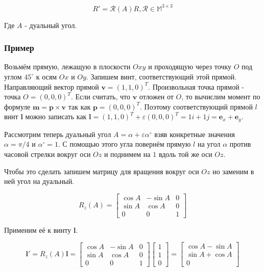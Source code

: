   \begin{equation*}
    R' = \mathcal{R}(A) R, \mathcal{R} \in \mathbb{M}^{3 \times 3}
  \end{equation*}

  Где $A$ - дуальный угол. 

  \subsubsection{Пример}
  Возьмём прямую, лежащую в плоскости $Oxy$ и проходящую через точку $O$ под углом $45^\circ$ к осям $Ox$ и $Oy$. Запишем винт, соответствующий этой прямой.
  Направляющий вектор прямой $\mathbf{v}=(1,1,0)^T$. Произвольная точка прямой - точка $O=(0,0,0)^T$. Если считать, что $\mathbf{v}$ отложен от $O$, то вычислим
  момент по формуле $\mathbf{m} = \mathbf{p} \times \mathbf{v}$ так как $\mathbf{p}=(0,0,0)^T$. Поэтому соответствующий прямой $l$ винт $\mathbf{l}$ можно записать как
  $\mathbf{l} = (1,1,0)^T + \varepsilon (0,0,0)^T = 1 i + 1 j = \mathbf{e}_x + \mathbf{e}_y$.

  Рассмотрим теперь дуальный угол $A=\alpha+\varepsilon \alpha^\circ$ взяв конкретные значения $\alpha=\pi/4$ и $\alpha^\circ=1$. С помощью этого угла повернём прямую $l$
  на угол $\alpha$ против часовой стрелки вокруг оси $Oz$ и поднимем на $1$ вдоль той же оси $Oz$. 

  Чтобы это сделать запишем матрицу для вращения вокруг оси $Oz$ но заменим в ней угол на дуальный.

  \begin{equation*}
    R_z(A)=
    \begin{bmatrix}
      \cos A & -\sin A & 0 \\
      \sin A & \cos A & 0 \\
      0 & 0 & 1
    \end{bmatrix}
  \end{equation*}

  Применим её к винту $\mathbf{l}$.

  \begin{equation*}
    \mathbf{l}'=R_z(A)\mathbf{l}=
    \begin{bmatrix}
      \cos A & -\sin A & 0 \\
      \sin A & \cos A & 0 \\
      0 & 0 & 1
    \end{bmatrix}
    \begin{bmatrix}
      1 \\
      1 \\
      0
    \end{bmatrix}
    =
    \begin{bmatrix}
      \cos A - \sin A \\
      \sin A + \cos A \\
      0
    \end{bmatrix}
  \end{equation*}


